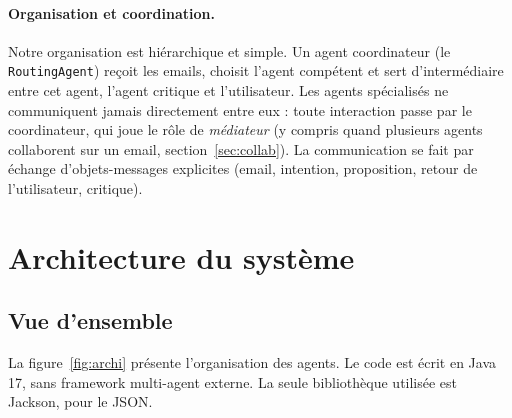 \documentclass[11pt,a4paper]{article}
\newcommand{\code}[1]{\texttt{#1}}
\begin{document}
\paragraph{Organisation et coordination.}
Notre organisation est hiérarchique et simple. Un agent coordinateur (le
\code{RoutingAgent}) reçoit les emails, choisit l'agent compétent et sert
d'intermédiaire entre cet agent, l'agent critique et l'utilisateur. Les agents
spécialisés ne communiquent jamais directement entre eux : toute interaction passe par le
coordinateur, qui joue le rôle de \emph{médiateur} (y compris quand plusieurs agents
collaborent sur un email, section~\ref{sec:collab}). La communication se fait par
échange d'objets-messages explicites (email, intention, proposition, retour de
l'utilisateur, critique).

\section{Architecture du système}

\subsection{Vue d'ensemble}

La figure~\ref{fig:archi} présente l'organisation des agents. Le code est écrit en Java
17, sans framework multi-agent externe. La seule bibliothèque utilisée est Jackson, pour
le JSON.
\end{document}

